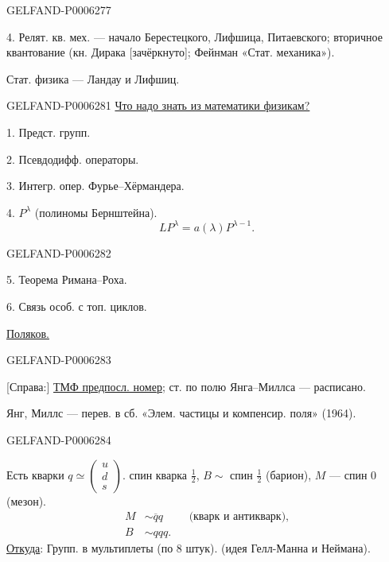 \begin{GelfandAdjacentEvidence}{GELFAND-P000627}{7}


4. Релят. кв. мех. --- начало Берестецкого, Лифшица, Питаевского; вторичное квантование
(кн. Дирака [зачёркнуто]; Фейнман «Стат. механика»).
\end{GelfandAdjacentEvidence}


Стат. физика --- Ландау и Лифшиц.


\begin{GelfandAdjacentEvidence}{GELFAND-P000628}{1}
\underline{Что надо знать из математики физикам?}

1. Предст. групп.

2. Псевдодифф. операторы.

3. Интегр. опер. Фурье--Хёрмандера.

4. \(P^\lambda\) (полиномы Бернштейна).
\[
LP^\lambda=a(\lambda)P^{\lambda-1}.
\]
\end{GelfandAdjacentEvidence}
\begin{GelfandAdjacentEvidence}{GELFAND-P000628}{2}


5. Теорема Римана--Роха.

6. Связь особ. с топ. циклов.

\underline{Поляков.}
\end{GelfandAdjacentEvidence}
\begin{GelfandAdjacentEvidence}{GELFAND-P000628}{3}

[Справа:] \underline{ТМФ предпосл. номер}; ст. по полю Янга--Миллса --- расписано.

Янг, Миллс --- перев. в сб. «Элем. частицы и компенсир. поля» (1964).
\end{GelfandAdjacentEvidence}
\begin{GelfandAdjacentEvidence}{GELFAND-P000628}{4}


Есть кварки \(q\simeq\begin{pmatrix}u\\d\\s\end{pmatrix}\).
спин кварка \(\tfrac12\),
\(B\sim\) спин \(\tfrac12\) (барион),
\(M\) --- спин \(0\) (мезон).
\[
\begin{aligned}
M&\sim\overline q q&&\text{(кварк и антикварк)},\\
B&\sim qqq.
\end{aligned}
\]
\underline{Откуда}: Групп. в мультиплеты (по 8 штук).
(идея Гелл-Манна и Неймана).
\end{GelfandAdjacentEvidence}
